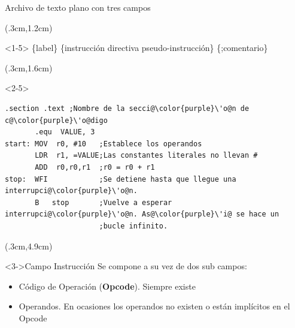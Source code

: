 \documentclass[usenames,table,dvipsnames,aspectratio=169]{beamer}
\begin{document}
\begin{frame}[fragile]{Archivo de texto plano con tres campos}
 \begin{textblock*}{\textwidth}(.3cm,1.2cm)
  \begin{onlyenv}<1-5>
   \{label\} \{instrucción \textbar directiva \textbar pseudo-instrucción\} \{;comentario\}
  \end{onlyenv}
 \end{textblock*}
 \begin{textblock*}{\textwidth}(.3cm,1.6cm)
  \begin{onlyenv}<2-5>
   \begin{lstlisting}[escapechar=\@,]
       .section .text ;Nombre de la secci@\color{purple}\'o@n de c@\color{purple}\'o@digo
       .equ  VALUE, 3     
start: MOV  r0, #10   ;Establece los operandos
       LDR  r1, =VALUE;Las constantes literales no llevan #
       ADD  r0,r0,r1  ;r0 = r0 + r1
stop:  WFI            ;Se detiene hasta que llegue una interrupci@\color{purple}\'o@n.
       B   stop       ;Vuelve a esperar interrupci@\color{purple}\'o@n. As@\color{purple}\'i@ se hace un 
                      ;bucle infinito. 
   \end{lstlisting}
  \end{onlyenv}
 \end{textblock*}
 \begin{textblock*}{\textwidth}(.3cm,4.9cm)
  \begin{block}<3->{Campo Instrucción}
   \justifying Se compone a su vez de dos sub campos:
   \begin{itemize}[<+(3)->] \justifying
    \item Código de Operación (\textbf{Opcode}). Siempre existe
    \item Operandos. En ocasiones los operandos no existen o están implícitos en el Opcode
   \end{itemize}
  \end{block}
 \end{textblock*}
\end{frame}
\end{document}
